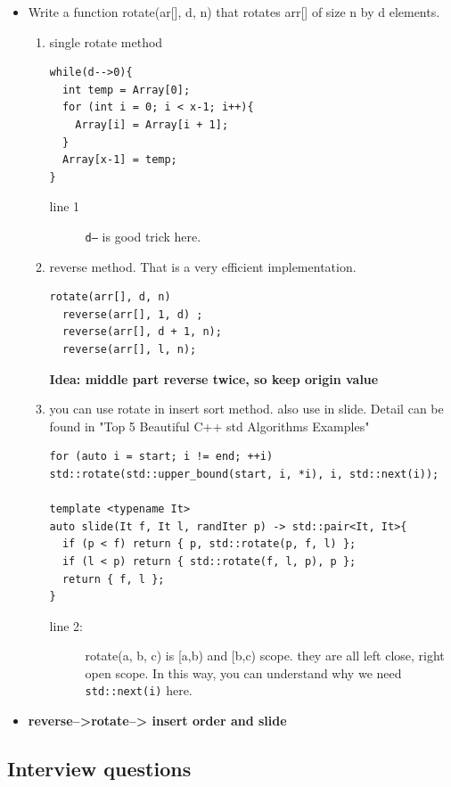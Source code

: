\documentclass[a4paper,11pt,twoside]{book}
\begin{document}
\begin{itemize}
\item Write a function rotate(ar[], d, n) that rotates arr[] of size n by d elements.
\begin{enumerate}
\item single rotate method
\begin{lstlisting}[breaklines]
while(d-->0){
  int temp = Array[0];
  for (int i = 0; i < x-1; i++){
    Array[i] = Array[i + 1];
  }
  Array[x-1] = temp;
}
\end{lstlisting}
\begin{description}
	\item[line 1] \texttt{d--} is good trick here.  
\end{description}

\item reverse method. That is a very efficient implementation.
\begin{lstlisting}[breaklines]
rotate(arr[], d, n)
  reverse(arr[], 1, d) ;
  reverse(arr[], d + 1, n);
  reverse(arr[], l, n);
\end{lstlisting}
\textbf{Idea: middle part reverse twice, so keep origin value}


\item you can use rotate in insert sort method. also use in slide. Detail can be found in "Top 5 Beautiful C++ std Algorithms Examples"
\begin{lstlisting}[breaklines, basicstyle=\scriptsize]
for (auto i = start; i != end; ++i)
std::rotate(std::upper_bound(start, i, *i), i, std::next(i));

template <typename It> 
auto slide(It f, It l, randIter p) -> std::pair<It, It>{
  if (p < f) return { p, std::rotate(p, f, l) };
  if (l < p) return { std::rotate(f, l, p), p };
  return { f, l };
}
\end{lstlisting}
\begin{description}
	\item[line 2:] rotate(a, b, c) is [a,b) and [b,c) scope. they are all left close, right open scope. In this way, you can understand why we need \texttt{std::next(i)} here.
\end{description}

\end{enumerate}

\item \textbf{reverse-->rotate--> insert order and slide}

\end{itemize}

\subsection{Interview questions}
\end{document}
